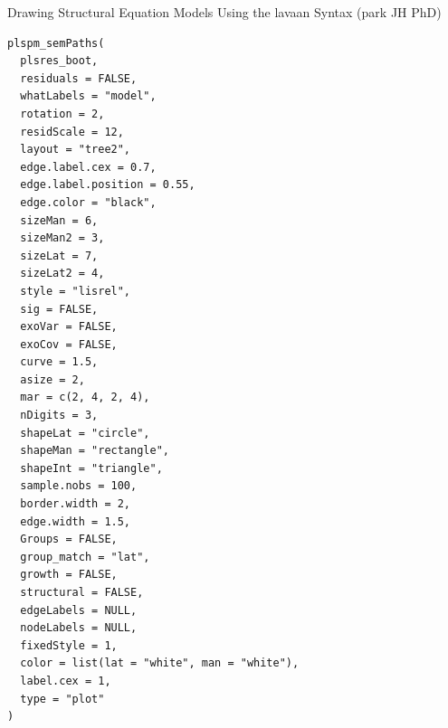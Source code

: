 \documentclass[a4paper]{book}
\begin{document}
%
\begin{Description}
Drawing Structural Equation Models Using the lavaan Syntax (park JH PhD)
\end{Description}
%
\begin{Usage}
\begin{verbatim}
plspm_semPaths(
  plsres_boot,
  residuals = FALSE,
  whatLabels = "model",
  rotation = 2,
  residScale = 12,
  layout = "tree2",
  edge.label.cex = 0.7,
  edge.label.position = 0.55,
  edge.color = "black",
  sizeMan = 6,
  sizeMan2 = 3,
  sizeLat = 7,
  sizeLat2 = 4,
  style = "lisrel",
  sig = FALSE,
  exoVar = FALSE,
  exoCov = FALSE,
  curve = 1.5,
  asize = 2,
  mar = c(2, 4, 2, 4),
  nDigits = 3,
  shapeLat = "circle",
  shapeMan = "rectangle",
  shapeInt = "triangle",
  sample.nobs = 100,
  border.width = 2,
  edge.width = 1.5,
  Groups = FALSE,
  group_match = "lat",
  growth = FALSE,
  structural = FALSE,
  edgeLabels = NULL,
  nodeLabels = NULL,
  fixedStyle = 1,
  color = list(lat = "white", man = "white"),
  label.cex = 1,
  type = "plot"
)
\end{verbatim}
\end{Usage}
%
\end{document}
